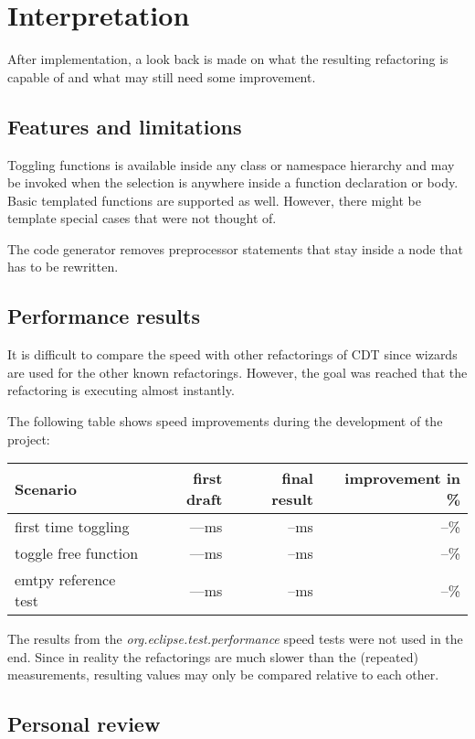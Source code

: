 \chapter{Interpretation}
\thispagestyle{fancy}

After implementation, a look back is made on what the resulting refactoring is 
capable of and what may still need some improvement.

\section{Features and limitations}

Toggling functions is available inside any class or namespace hierarchy and may 
be invoked when the selection is anywhere inside a function declaration or body. 
Basic templated functions are supported as well. However, there might be 
template special cases that were not thought of.

The code generator removes preprocessor statements that stay inside a node that 
has to be rewritten.

\section{Performance results}

It is difficult to compare the speed with other refactorings of CDT since wizards 
are used for the other known refactorings. However, the goal was reached that 
the refactoring is executing almost instantly.

The following table shows speed improvements during the development of the 
project:

\begin{tabular}[t]{l|rrr}
 Scenario   & first draft & final result & improvement in \% \\
 \hline
 first time toggling 	&  ---ms & --ms & --\% \\
 toggle free function	&  ---ms & --ms & --\% \\
 emtpy reference test	&  ---ms & --ms & --\% \\
\end{tabular}

The results from the \textit{org.eclipse.test.performance} speed tests were not 
used in the end. Since in reality the refactorings are much slower than the 
(repeated) measurements, resulting values may only be compared relative to each 
other.

\section{Personal review}

